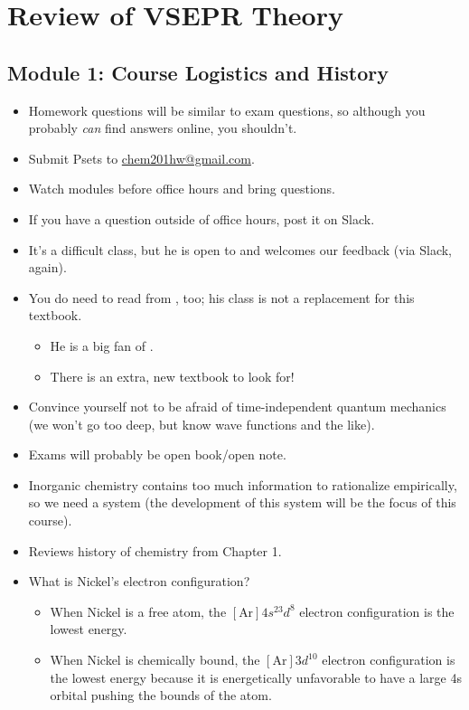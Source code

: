 \documentclass[../main.tex]{subfiles}
\begin{document}
\chapter{Review of VSEPR Theory}
\section{Module 1: Course Logistics and History}
\begin{itemize}
    \item {}Homework questions will be similar to exam questions, so although you probably \emph{can} find answers online, you shouldn't.
    \item Submit Psets to \href{mailto:chem201hw@gmail.com}{chem201hw@gmail.com}.
    \item Watch modules before office hours and bring questions.
    \item If you have a question outside of office hours, post it on Slack.
    \item It's a difficult class, but he is open to and welcomes our feedback (via Slack, again).
    \item You do need to read from \textcite{bib:MiesslerFischerTarr}, too; his class is not a replacement for this textbook.
    \begin{itemize}
        \item He is a big fan of \textcite{bib:Cotton}.
        \item There is an extra, new textbook to look for!
    \end{itemize}
    \item Convince yourself not to be afraid of time-independent quantum mechanics (we won't go too deep, but know wave functions and the like).
    \item Exams will probably be open book/open note.
    \item Inorganic chemistry contains too much information to rationalize empirically, so we need a system (the development of this system will be the focus of this course).
    \item Reviews history of chemistry from \textcite{bib:MiesslerFischerTarr} Chapter 1.
    \item What is Nickel's electron configuration?
    \begin{itemize}
        \item When Nickel is a free atom, the $[\text{Ar}]4s^23d^8$ electron configuration is the lowest energy.
        \item When Nickel is chemically bound, the $[\text{Ar}]3d^{10}$ electron configuration is the lowest energy because it is energetically unfavorable to have a large 4s orbital pushing the bounds of the atom.

\end{itemize}
\end{itemize}
\end{document}
